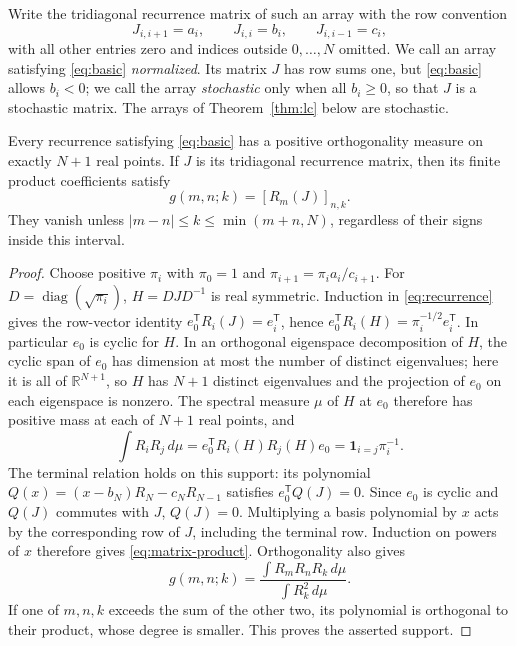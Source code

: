 Write the tridiagonal recurrence matrix of such an array with the row convention
\[
J_{i,i+1}=a_i,\qquad J_{i,i}=b_i,\qquad J_{i,i-1}=c_i,
\]
with all other entries zero and indices outside $0,\ldots,N$ omitted. We call an array satisfying \eqref{eq:basic} \emph{normalized}. Its matrix $J$ has row sums one, but \eqref{eq:basic} allows $b_i<0$; we call the array \emph{stochastic} only when all $b_i\geq0$, so that $J$ is a stochastic matrix. The arrays of Theorem~\ref{thm:lc} below are stochastic.

\begin{lemma}\label{lem:finite}
Every recurrence satisfying \eqref{eq:basic} has a positive orthogonality measure on exactly $N+1$ real points. If $J$ is its tridiagonal recurrence matrix, then its finite product coefficients satisfy
\begin{equation}\label{eq:matrix-product}
g(m,n;k)=[R_m(J)]_{n,k}.
\end{equation}
They vanish unless $|m-n|\leq k\leq\min(m+n,N)$, regardless of their signs inside this interval.
\end{lemma}
\begin{proof}
Choose positive $\pi_i$ with $\pi_0=1$ and $\pi_{i+1}=\pi_i a_i/c_{i+1}$. For $D=\operatorname{diag}(\sqrt{\pi_i})$, $H=DJD^{-1}$ is real symmetric. Induction in \eqref{eq:recurrence} gives the row-vector identity $e_0^\mathsf T R_i(J)=e_i^\mathsf T$, hence $e_0^\mathsf T R_i(H)=\pi_i^{-1/2}e_i^\mathsf T$. In particular $e_0$ is cyclic for $H$. In an orthogonal eigenspace decomposition of $H$, the cyclic span of $e_0$ has dimension at most the number of distinct eigenvalues; here it is all of $\mathbb R^{N+1}$, so $H$ has $N+1$ distinct eigenvalues and the projection of $e_0$ on each eigenspace is nonzero. The spectral measure $\mu$ of $H$ at $e_0$ therefore has positive mass at each of $N+1$ real points, and
\[
\int R_iR_j\,d\mu=e_0^\mathsf TR_i(H)R_j(H)e_0
=\boldsymbol1_{i=j}\pi_i^{-1}.
\]
The terminal relation holds on this support: its polynomial $Q(x)=(x-b_N)R_N-c_NR_{N-1}$ satisfies $e_0^\mathsf TQ(J)=0$. Since $e_0$ is cyclic and $Q(J)$ commutes with $J$, $Q(J)=0$.
Multiplying a basis polynomial by $x$ acts by the corresponding row of $J$, including the terminal row. Induction on powers of $x$ therefore gives \eqref{eq:matrix-product}. Orthogonality also gives
\[
g(m,n;k)=\frac{\int R_mR_nR_k\,d\mu}{\int R_k^2\,d\mu}.
\]
If one of $m,n,k$ exceeds the sum of the other two, its polynomial is orthogonal to their product, whose degree is smaller. This proves the asserted support.
\end{proof}

